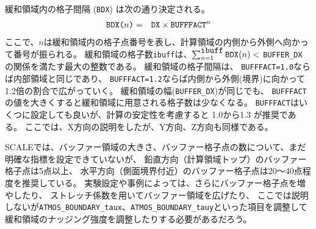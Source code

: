 緩和領域内の格子間隔 (\verb|BDX|) は次の通り決定される。
\begin{eqnarray}
 \verb|BDX(|n\verb|)| &=& \verb|DX| \times \verb|BUFFFACT|^n \nonumber
\end{eqnarray}
ここで、$n$は緩和領域内の格子点番号を表し、計算領域の内側から外側へ向かって番号が振られる。
緩和領域の格子数\verb|ibuff|は、$\sum_{n=1}^{\verb|ibuff|} \verb|BDX|(n) <$ \verb|BUFFER_DX| の関係を満たす最大の整数である。
%
緩和領域の格子間隔は、
\verb|BUFFFACT=1.0|ならば内部領域と同じであり、
\verb|BUFFFACT=1.2|ならば内側から外側(境界)に向かって1.2倍の割合で広がっていく。
緩和領域の幅(\verb|BUFFER_DX|)が同じでも、
\verb|BUFFFACT|の値を大きくすると緩和領域に用意される格子数は少なくなる。
\verb|BUFFFACT|はいくつに設定しても良いが、計算の安定性を考慮すると 1.0から1.3 が推奨である。
ここでは、X方向の説明をしたが、Y方向、Z方向も同様である。


SCALEでは、バッファー領域の大きさ、バッファー格子点の数について、まだ明確な指標を設定できていないが、
鉛直方向（計算領域トップ）のバッファー格子点は5点以上、
水平方向（側面境界付近）のバッファー格子点は20〜40点程度を推奨している。
実験設定や事例によっては、さらにバッファー格子点を増やしたり、
ストレッチ係数を用いてバッファー領域を広げたり、
ここでは説明しないが\verb|ATMOS_BOUNDARY_taux|、\verb|ATMOS_BOUNDARY_tauy|といった項目を調整して
緩和領域のナッジング強度を調整したりする必要があるだろう。

